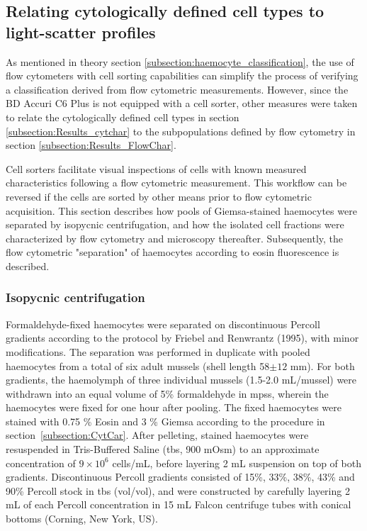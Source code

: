 \subsection{Relating cytologically defined cell types to light-scatter profiles}
As mentioned in theory section \ref{subsection:haemocyte_classification}, the use of flow cytometers with cell sorting capabilities can simplify the process of verifying a classification derived from flow cytometric measurements. However, since the BD Accuri C6 Plus is not equipped with a cell sorter, other measures were taken to relate the cytologically defined cell types in section \ref{subsection:Results_cytchar} to the subpopulations defined by flow cytometry in section \ref{subsection:Results_FlowChar}.

Cell sorters facilitate visual inspections of cells with known measured characteristics following a flow cytometric measurement. This workflow can be reversed if the cells are sorted by other means prior to flow cytometric acquisition. This section describes how pools of Giemsa-stained haemocytes were separated by isopycnic centrifugation, and how the isolated cell fractions were characterized by flow cytometry and microscopy thereafter. Subsequently, the flow cytometric "separation" of haemocytes according to eosin fluorescence is described.

\subsubsection{Isopycnic centrifugation}
Formaldehyde-fixed haemocytes were separated on discontinuous Percoll gradients according to the protocol by Friebel and Renwrantz (1995), with minor modifications. The separation was performed in duplicate with pooled haemocytes from a total of six adult mussels (shell length 58$\pm{12}$ mm). For both gradients, the haemolymph of three individual mussels (1.5-2.0 mL/mussel) were withdrawn into an equal volume of 5\% formaldehyde in \acrshort{mpss}, wherein the haemocytes were fixed for one hour after pooling. The fixed haemocytes were stained with 0.75 \% Eosin and 3 \% Giemsa according to the procedure in section~\ref{subsection:CytCar}. After pelleting, stained haemocytes were resuspended in Tris-Buffered Saline (\acrshort{tbs}, 900 mOsm) to an approximate concentration of $9\times10^{6}$ cells/mL, before layering 2 mL suspension on top of both gradients. Discontinuous Percoll gradients consisted of 15\%, 33\%, 38\%, 43\% and 90\% Percoll stock in \acrshort{tbs} (vol/vol), and were constructed by carefully layering 2 mL of each Percoll concentration in 15 mL Falcon centrifuge tubes with conical bottoms (Corning, New York, US).

